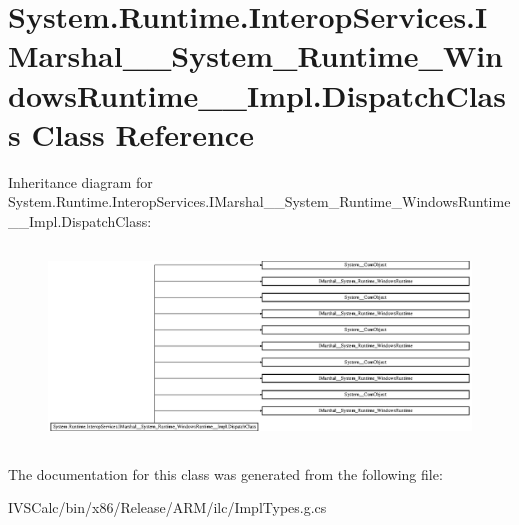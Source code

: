 \hypertarget{class_system_1_1_runtime_1_1_interop_services_1_1_i_marshal_____system___runtime___windows_runtime_____impl_1_1_dispatch_class}{}\section{System.\+Runtime.\+Interop\+Services.\+I\+Marshal\+\_\+\+\_\+\+System\+\_\+\+Runtime\+\_\+\+Windows\+Runtime\+\_\+\+\_\+\+Impl.\+Dispatch\+Class Class Reference}
\label{class_system_1_1_runtime_1_1_interop_services_1_1_i_marshal_____system___runtime___windows_runtime_____impl_1_1_dispatch_class}
Inheritance diagram for System.\+Runtime.\+Interop\+Services.\+I\+Marshal\+\_\+\+\_\+\+System\+\_\+\+Runtime\+\_\+\+Windows\+Runtime\+\_\+\+\_\+\+Impl.\+Dispatch\+Class\+:\begin{figure}[H]
\begin{center}
\leavevmode
\includegraphics[height=5.310345cm]{class_system_1_1_runtime_1_1_interop_services_1_1_i_marshal_____system___runtime___windows_runtime_____impl_1_1_dispatch_class}
\end{center}
\end{figure}


The documentation for this class was generated from the following file\+:\begin{DoxyCompactItemize}
\item 
I\+V\+S\+Calc/bin/x86/\+Release/\+A\+R\+M/ilc/Impl\+Types.\+g.\+cs\end{DoxyCompactItemize}
